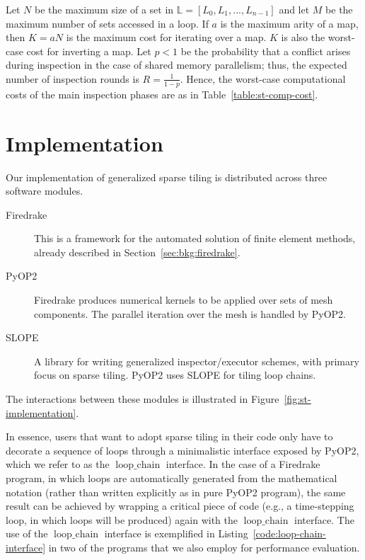 Let $N$ be the maximum size of a set in $\mathbb{L} = [L_0, L_1, ..., L_{n-1}]$ and let $M$ be the maximum number of sets accessed in a loop. If $a$ is the maximum arity of a map, then $K = a N$ is the maximum cost for iterating over a map. $K$ is also the worst-case cost for inverting a map. Let $p < 1$ be the probability that a conflict arises during inspection in the case of shared memory parallelism; thus, the expected number of inspection rounds is $R = \frac{1}{1-p}$. Hence, the worst-case computational costs of the main inspection phases are as in Table~\ref{table:st-comp-cost}.




\section{Implementation}
\label{sec:tiling:automation}
Our implementation of generalized sparse tiling is distributed across three software modules. 
\begin{description}
\item[Firedrake] This is a framework for the automated solution of finite element methods, already described in Section~\ref{sec:bkg:firedrake}.
\item[PyOP2] Firedrake produces numerical kernels to be applied over sets of mesh components. The parallel iteration over the mesh is handled by PyOP2.
\item[SLOPE] A library for writing generalized inspector/executor schemes, with primary focus on sparse tiling. PyOP2 uses SLOPE for tiling loop chains.
\end{description}
The interactions between these modules is illustrated in Figure~\ref{fig:st-implementation}.

In essence, users that want to adopt sparse tiling in their code only have to decorate a sequence of loops through a minimalistic interface exposed by PyOP2, which we refer to as the $\operatorname{loop\_chain}$ interface. In the case of a Firedrake program, in which loops are automatically generated from the mathematical notation (rather than written explicitly as in pure PyOP2 program), the same result can be achieved by wrapping a critical piece of code (e.g., a time-stepping loop, in which loops will be produced) again with the $\operatorname{loop\_chain}$ interface. The use of the $\operatorname{loop\_chain}$ interface is exemplified in Listing~\ref{code:loop-chain-interface} in two of the programs that we also employ for performance evaluation.

